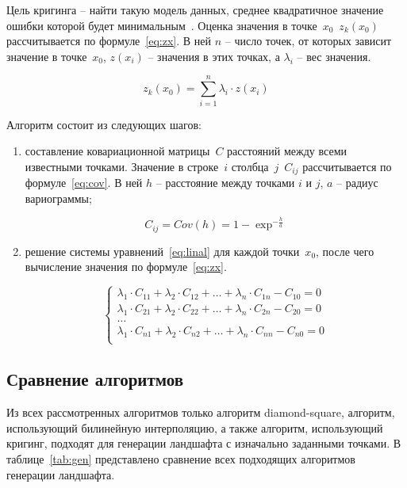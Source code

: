 Цель кригинга – найти такую модель данных, среднее квадратичное значение ошибки которой будет минимальным~\cite{criging}. Оценка значения в точке~$x_0$~$z_k(x_0)$ рассчитывается по формуле~\ref{eq:zx}. В ней $n$ -- число точек, от которых зависит значение в точке~$x_0$, $z(x_i)$ -- значения в этих точках, а $\lambda_i$ -- вес значения.

\begin{equation}
	\label{eq:zx}
	z_k(x_0) = \sum_{i=1}^{n}\lambda_i \cdot z(x_i)
\end{equation}

Алгоритм состоит из следующих шагов:

\begin{enumerate}
	\item составление ковариационной матрицы~$C$ расстояний между всеми известными точками. Значение в строке~$i$ столбца~$j$~$C_{ij}$ рассчитывается по формуле~\ref{eq:cov}. В ней $h$ -- расстояние между точками $i$ и $j$, $a$ -- радиус вариограммы;
	
\begin{equation}
	\label{eq:cov}
	C_{ij} = Cov(h) = 1 - \exp^{-\frac{h}{a}}
\end{equation}
	
	\item решение системы уравнений~\ref{eq:linal} для каждой точки~$x_0$, после чего вычисление значения по формуле~\ref{eq:zx}.
	
\begin{equation}
	\label{eq:linal}
	\begin{cases}
		\lambda_1 \cdot C_{11} + \lambda_2 \cdot C_{12} + \ldots + \lambda_n \cdot C_{1n} - C_{10} = 0\\
		\lambda_1 \cdot C_{21} + \lambda_2 \cdot C_{22} + \ldots + \lambda_n \cdot C_{2n} - C_{20} = 0\\
		\ldots\\
		\lambda_1 \cdot C_{n1} + \lambda_2 \cdot C_{n2} + \ldots + \lambda_n \cdot C_{nn} - C_{n0} = 0\\
	\end{cases}
\end{equation}

\end{enumerate}

\subsection{Сравнение алгоритмов}

Из всех рассмотренных алгоритмов только алгоритм diamond-square, алгоритм, использующий билинейную интерполяцию, а также алгоритм, использующий кригинг, подходят для генерации ландшафта с изначально заданными точками. В таблице~\ref{tab:gen} представлено сравнение всех подходящих алгоритмов генерации ландшафта.

